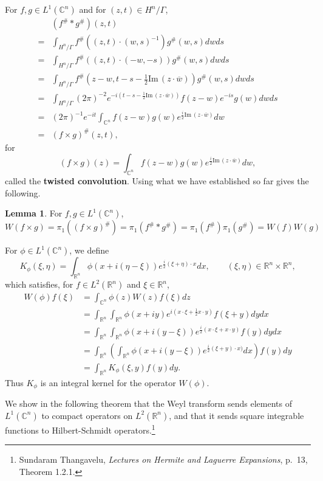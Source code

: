 \documentclass{article}
\def\Im{\ensuremath{\mathrm{Im}}\,}
\theoremstyle{definition}
\newtheorem{lemma}[theorem]{Lemma}
\theoremstyle{definition}
\begin{document}
For $f,g \in L^1(\mathbb{C}^n)$ and for $(z,t) \in H^n/\Gamma$,
\[
\begin{split}
&(f^{\#} * g^{\#})(z,t)\\
=&\int_{H^n/\Gamma} f^{\#}((z,t)\cdot (w,s)^{-1}) g^{\#}(w,s) dw ds\\
=&\int_{H^n/\Gamma} f^{\#}((z,t)\cdot (-w,-s ) ) g^{\#}(w,s) dw ds\\
=&\int_{H^n/\Gamma} f^{\#}\left(z-w,t-s-\frac{1}{2}\Im(z\cdot \overline{w}) \right)
g^{\#}(w,s) dw ds\\
=&\int_{H^n/\Gamma} (2\pi)^{-2} e^{-i\left(t-s-\frac{1}{2}\Im(z\cdot \overline{w})\right)} 
f(z-w) e^{-is} g(w) dw ds\\
=&(2\pi)^{-1} e^{-it} \int_{\mathbb{C}^n} f(z-w) g(w) e^{\frac{i}{2} \Im(z \cdot \overline{w})}
dw\\
=&(f \times g)^{\#}(z,t),
\end{split}
\]
for
\[
(f \times g)(z) =  \int_{\mathbb{C}^n} f(z-w) g(w) e^{\frac{i}{2} \Im(z \cdot \overline{w})}
dw,
\]
called  the \textbf{twisted convolution}. 
Using what we have established so far gives the following.

\begin{lemma}
For $f,g \in L^1(\mathbb{C}^n)$,
\[
W(f \times g)=\pi_1((f \times g)^{\#})=
\pi_1(f^{\#} * g^{\#})=
\pi_1(f^{\#}) \pi_1(g^{\#})
=W(f) W(g)
\]
\end{lemma}


For $\phi \in L^1(\mathbb{C}^n)$, we define
\[
K_\phi(\xi,\eta) = \int_{\mathbb{R}^n} \phi(x+i(\eta-\xi)) e^{\frac{i}{2}(\xi+\eta)\cdot x} dx,\qquad
(\xi,\eta) \in \mathbb{R}^n \times \mathbb{R}^n,
\]
which satisfies, for $f \in L^2(\mathbb{R}^n)$ and $\xi \in \mathbb{R}^n$,
\begin{align*}
W(\phi) f(\xi)&=\int_{\mathbb{C}^n} \phi(z) W(z) f(\xi) dz\\
&=\int_{\mathbb{R}^n} \int_{\mathbb{R}^n} \phi(x+iy) e^{i\left(x\cdot \xi + \frac{1}{2}x\cdot y\right)}  f(\xi+y) dy dx\\
&=\int_{\mathbb{R}^n} \int_{\mathbb{R}^n} \phi(x+i(y-\xi)) e^{\frac{i}{2}(x\cdot \xi +x\cdot y)} f(y) dy dx\\
&=\int_{\mathbb{R}^n} \left(\int_{\mathbb{R}^n} \phi(x+i(y-\xi)) e^{\frac{i}{2}(\xi+y)\cdot x)} dx \right) f(y) dy\\
&=\int_{\mathbb{R}^n} K_\phi(\xi,y)f(y) dy.
\end{align*}
Thus $K_\phi$ is an integral kernel for  the operator $W(\phi)$. 


We show in the following theorem that the Weyl transform sends elements of $L^1(\mathbb{C}^n)$ to  compact operators on
$L^2(\mathbb{R}^n)$, and that 
it sends square integrable functions to Hilbert-Schmidt operators.\footnote{Sundaram Thangavelu, {\em Lectures on Hermite and Laguerre Expansions},
p.~13, Theorem 1.2.1.}
\end{document}
